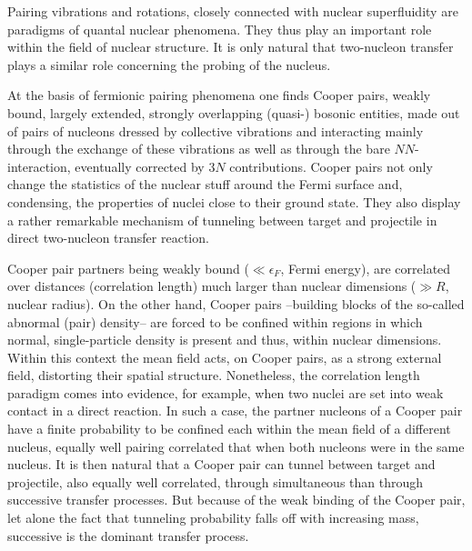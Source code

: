 Pairing vibrations and rotations, closely connected with nuclear superfluidity are  paradigms of quantal nuclear phenomena. They thus play an important  role within the field of nuclear structure. It is only natural that two-nucleon transfer plays a similar role concerning the probing of the nucleus.

 
At the basis of fermionic pairing phenomena one finds Cooper pairs, weakly bound, largely extended, strongly overlapping (quasi-) bosonic entities, made out of pairs of nucleons dressed by collective vibrations and interacting mainly through the exchange of these vibrations as well as through the bare $NN$-interaction, eventually corrected by $3N$ contributions.
Cooper pairs not only change the statistics of the nuclear stuff around the Fermi surface and, condensing, the properties of nuclei close to their ground state. They also display a rather remarkable mechanism of tunneling between  target and projectile in  direct two-nucleon transfer reaction.


Cooper pair partners being weakly bound ($\ll \epsilon_F$, Fermi energy), are correlated over distances (correlation length) much larger than nuclear dimensions ($\gg R$, nuclear radius). On the other hand, Cooper pairs --building blocks of the so-called abnormal (pair) density-- are forced to be confined within regions in which normal, single-particle density is present and thus, within nuclear dimensions. Within this context the mean field acts, on Cooper pairs, as a strong external field,  distorting their spatial structure.
Nonetheless,  the correlation length paradigm comes into evidence, for example, when two nuclei are set into weak contact in a direct reaction. In such a  case,  the partner nucleons of a Cooper pair have a finite probability to be confined each within the mean field of a different nucleus, equally well pairing correlated that when both nucleons were in the same nucleus. It is then natural that a Cooper pair can tunnel between target and projectile, also equally well correlated, through simultaneous than through successive transfer processes. But because of the weak binding of the Cooper pair, let alone the fact that tunneling probability falls off with increasing mass, successive is the dominant transfer process.
 
